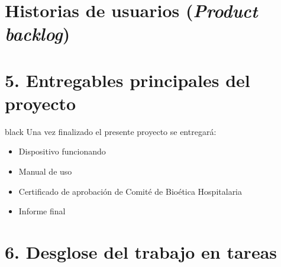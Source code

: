 \documentclass[11pt]{charter}
\begin{document}
\pagebreak

\section{Historias de usuarios (\textit{Product backlog})}
\label{sec:backlog}

\pagebreak

\section{5. Entregables principales del proyecto}
\label{sec:entregables}
\begin{consigna}{black}
Una vez finalizado el presente proyecto se entregará:
\begin{itemize}
\item Dispositivo funcionando
\item Manual de uso
\item Certificado de aprobación de Comité de Bioética Hospitalaria
\item Informe final

\end{itemize}

\end{consigna}

\pagebreak

\section{6. Desglose del trabajo en tareas}
\label{sec:wbs}
\end{document}
